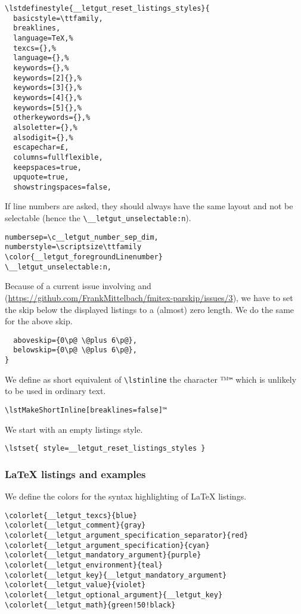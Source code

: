 \documentclass{letgut}
\begin{document}
\begin{lstlisting}
\lstdefinestyle{__letgut_reset_listings_styles}{
  basicstyle=\ttfamily,
  breaklines,
  language=TeX,%
  texcs={},%
  language={},%
  keywords={},%
  keywords=[2]{},%
  keywords=[3]{},%
  keywords=[4]{},%
  keywords=[5]{},%
  otherkeywords={},%
  alsoletter={},%
  alsodigit={},%
  escapechar=£,
  columns=fullflexible,
  keepspaces=true,
  upquote=true,
  showstringspaces=false,
\end{lstlisting}

If line numbers are asked, they should always have the same layout and not be
selectable (hence the \lstinline+\__letgut_unselectable:n+).

\begin{lstlisting}
numbersep=\c__letgut_number_sep_dim,
numberstyle=\scriptsize\ttfamily
\color{__letgut_foregroundLinenumber}
\__letgut_unselectable:n,
\end{lstlisting}

Because of a current issue involving  and 
(\url{https://github.com/FrankMittelbach/fmitex-parskip/issues/3}), we have to
set the skip below the displayed listings to a (almost) zero length. We do the
same for the above skip.

\begin{lstlisting}
  aboveskip={0\p@ \@plus 6\p@},
  belowskip={0\p@ \@plus 6\p@},
}
\end{lstlisting}

We define as short equivalent of \lstinline+\lstinline+ the character
\lstDeleteShortInline™\texttt{™} which is unlikely to be used in ordinary text.

\begin{lstlisting}
\lstMakeShortInline[breaklines=false]™
\end{lstlisting}

We start with an empty listings style.

\begin{lstlisting}
\lstset{ style=__letgut_reset_listings_styles }
\end{lstlisting}

\subsubsection{\LaTeX{} listings and examples}
\label{ImplementationListingsLaTeXlistingsandexamples-xt4h55h0jlj0}
We define the colors for the syntax highlighting of \LaTeX{} listings.

\begin{lstlisting}
\colorlet{__letgut_texcs}{blue}
\colorlet{__letgut_comment}{gray}
\colorlet{__letgut_argument_specification_separator}{red}
\colorlet{__letgut_argument_specification}{cyan}
\colorlet{__letgut_mandatory_argument}{purple}
\colorlet{__letgut_environment}{teal}
\colorlet{__letgut_key}{__letgut_mandatory_argument}
\colorlet{__letgut_value}{violet}
\colorlet{__letgut_optional_argument}{__letgut_key}
\colorlet{__letgut_math}{green!50!black}
\end{lstlisting}
\end{document}
